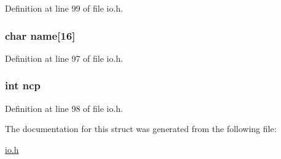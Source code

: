 Definition at line 99 of file io.\-h.

\hypertarget{structcolormap__t_acd328517a6cf718155c2e6e22b671ca9}{
\subsubsection[{name}]{\setlength{\rightskip}{0pt plus 5cm}char name\mbox{[}16\mbox{]}}}\label{structcolormap__t_acd328517a6cf718155c2e6e22b671ca9}


Definition at line 97 of file io.\-h.

\hypertarget{structcolormap__t_a8f4ec518913edf916c0dc3cbb49991b7}{
\subsubsection[{ncp}]{\setlength{\rightskip}{0pt plus 5cm}int ncp}}\label{structcolormap__t_a8f4ec518913edf916c0dc3cbb49991b7}


Definition at line 98 of file io.\-h.



The documentation for this struct was generated from the following file\-:\begin{DoxyCompactItemize}
\item 
\hyperlink{io_8h}{io.\-h}\end{DoxyCompactItemize}
